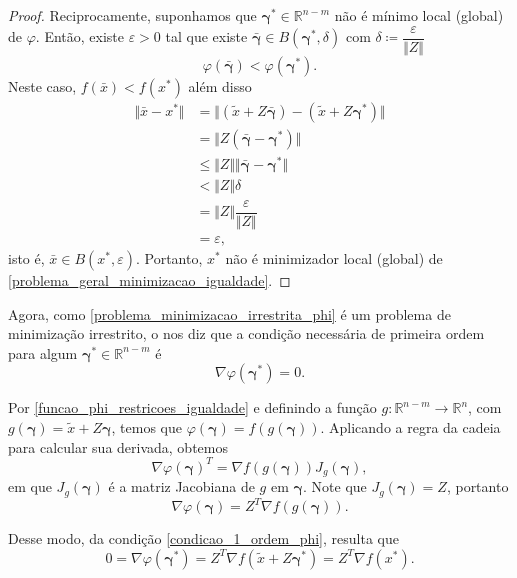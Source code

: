\documentclass[12pt,a4paper]{scrartcl}
\def\RR{\mathds{R}}
\def\xbar{\bar{x}}
\theoremstyle{definition}%
\begin{document}
\begin{proof}
Reciprocamente, suponhamos que $\boldsymbol{\gamma}^{*} \in \RR^{n-m}$ não é mínimo local (global) de $\varphi$. Então, existe $\varepsilon >0$ tal que existe $\boldsymbol{\bar{\gamma}} \in B(\boldsymbol{\gamma}^{*} , \delta )$ com $\delta \coloneqq \dfrac{\varepsilon}{\Vert Z\Vert}$
\[ \label{eq:1_prop:equivalencia_problema_restricoes_igualdade_irrestrito}
\varphi(\boldsymbol{\bar{\gamma}}) < \varphi({\boldsymbol{\gamma}^{*}}) .
\]
Neste caso, $f(\xbar) < f(x^{*})$ além disso
\[
\begin{aligned}
\Vert \xbar -x^{*} \Vert &= \Vert (\tilde{x} + Z\boldsymbol{\bar{\gamma}}) - (\tilde{x} + Z\boldsymbol{\gamma}^{*}) \Vert \\
&= \Vert Z(\boldsymbol{\bar{\gamma}} - \boldsymbol{\gamma}^{*} )\Vert \\
&\leq \Vert Z\Vert \Vert \boldsymbol{\bar{\gamma}} - \boldsymbol{\gamma}^{*} \Vert \\
&< \Vert Z\Vert \delta \\
&= \Vert Z\Vert \dfrac{\varepsilon}{\Vert Z \Vert} \\
&= \varepsilon , 
\end{aligned}
\]
isto é, $\xbar \in B(x^{*} , \varepsilon )$. Portanto, $x^{*}$ não é minimizador local (global) de \eqref{problema_geral_minimizacao_igualdade}.
\end{proof}

Agora, como \eqref{problema_minimizacao_irrestrita_phi} é um problema de minimização irrestrito, o  nos diz que a condição necessária de primeira ordem para algum $\boldsymbol{\gamma}^{*} \in \RR^{n-m}$ é
\[ \label{condicao_1_ordem_phi}
\nabla \varphi(\boldsymbol{\gamma}^{*}) = 0.
\]

Por \eqref{funcao_phi_restricoes_igualdade} e definindo a função $g: \RR^{n-m} \rightarrow \RR^{n}$, com $g(\boldsymbol{\gamma}) = \tilde{x} + Z\boldsymbol{\gamma}$, temos que $\varphi(\boldsymbol{\gamma}) = f(g(\boldsymbol{\gamma}))$. Aplicando a regra da cadeia para calcular sua derivada, obtemos
\[
\nabla \varphi (\boldsymbol{\gamma})^{T} = \nabla f(g(\boldsymbol{\gamma})) J_{g}(\boldsymbol{\gamma}) ,
\]
em que $J_{g}(\boldsymbol{\gamma})$ é a matriz Jacobiana de $g$ em $\boldsymbol{\gamma}$. Note que $J_{g}(\boldsymbol{\gamma}) = Z$, portanto
\[
\nabla \varphi(\boldsymbol{\gamma}) = Z^{T}\nabla f(g(\boldsymbol{\gamma})) .
\]

Desse modo, da condição \eqref{condicao_1_ordem_phi}, resulta que
\[
0 = \nabla \varphi (\boldsymbol{\gamma}^{*}) = Z^{T} \nabla f(\tilde{x} + Z\boldsymbol{\gamma}^{*}) = Z^{T} \nabla f(x^{*}).
\]
\end{document}

